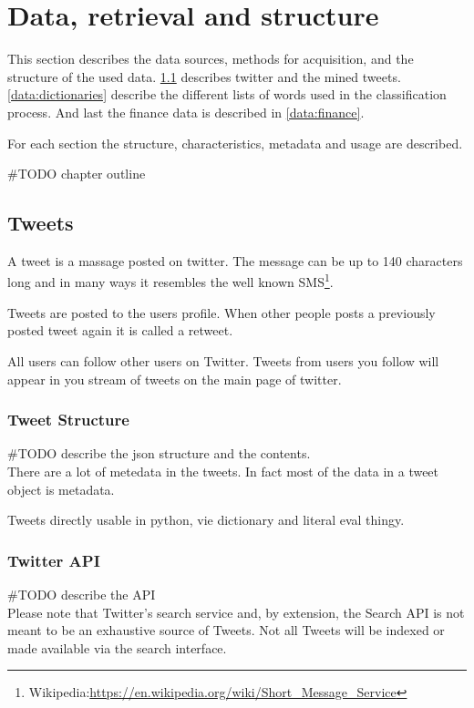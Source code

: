 \chapter{Data, retrieval and structure}

This section describes the data sources, methods for acquisition, and the
structure of the used data. \ref{data:tweets} describes twitter and the mined
tweets. \ref{data:dictionaries} describe the different lists of words used in
the classification process. And last the finance data is described in
\ref{data:finance}.

For each section the structure, characteristics, metadata and usage are
described. 

#TODO chapter outline
%

\section{Tweets}\label{data:tweets}
A tweet is a massage posted on twitter. The message can be up to 140 characters
long and in many ways it resembles the well known
SMS\footnote{Wikipedia:\url{https://en.wikipedia.org/wiki/Short_Message_Service}}.

Tweets are posted to the users profile. When other people posts a previously
posted tweet again it is called a retweet.

All users can follow other users on Twitter. Tweets from users you follow will
appear in you stream of tweets on the main page of twitter.
%

\subsection{Tweet Structure}
#TODO describe the json structure and the contents.\\
There are a lot of metedata in the tweets. In fact most of the data in a tweet
object is metadata. 

Tweets directly usable in python, vie dictionary and literal eval thingy. 
%

\subsection{Twitter API}
#TODO describe the API\\

Please note that Twitter's search service and, by extension, the Search API is
not meant to be an exhaustive source of Tweets. Not all Tweets will be indexed
or made available via the search interface.


